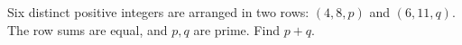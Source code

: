 Six distinct positive integers are arranged in two rows: $(4,8,p)$ and $(6,11,q)$. The row sums are equal, and $p,q$ are prime. Find $p+q$.
